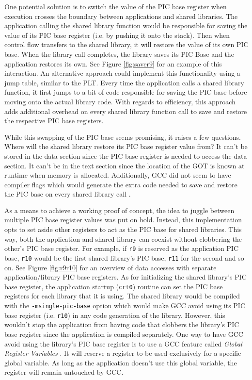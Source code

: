\documentclass[12pt]{ucsddissertation}
\begin{document}
One potential solution is to switch the value of the PIC base register when execution crosses the boundary between applications and shared libraries. The application calling the shared library function would be responsible for saving the value of its PIC base register (i.e. by pushing it onto the stack). Then when control flow transfers to the shared library, it will restore the value of its own PIC base. When the library call completes, the library saves its PIC Base and the application restores its own. See Figure \ref{fig:saver9} for an example of this interaction. An alternative approach could implement this functionality using a jump table, similar to the PLT. Every time the application calls a shared library function, it first jumps to a bit of code responsible for saving the PIC base before moving onto the actual library code. With regards to efficiency, this approach adds additional overhead on every shared library function call to save and restore the respective PIC base registers.

While this swapping of the PIC base seems promising, it raises a few questions. Where will the shared library restore its PIC base register value from? It can't be stored in the data section since the PIC base register is needed to access the data section. It can't be in the text section since the location of the GOT is known at runtime when memory is allocated. Additionally, GCC did not seem to have compiler flags which would generate the extra code needed to save and restore the PIC base on every shared library call \cite{gcc-codegen}. 

As a means to achieve a working proof of concept, the idea to juggle between multiple PIC base register values was put on hold. Instead, this implementation opts to set aside other registers to act as the PIC base for shared libraries. This way, both the application and shared library can coexist without clobbering the other's PIC base register. For example, if \texttt{r9} is reserved as the application PIC base, \texttt{r10} would be the first shared library's PIC base, \texttt{r11} for the second and so on. See Figure \ref{fig:r9r10} for an overview of data accesses with separate application/library PIC base registers. As for initializing the shared library's PIC base register, the application startup (\texttt{crt0}) routine can set the PIC base registers for each library that it is using. The shared library would be compiled with the \texttt{-msingle-pic-base} option which would make GCC avoid using its PIC base register (i.e. \texttt{r10}) in any code generation of the library. However, this wouldn't stop the application from having code that clobbers the library's PIC base register since the application is compiled separately. One way to have GCC avoid using the library's PIC base register is to use a GCC feature called \textit{Global Register Variables} \cite{gcc-hwreg}. It will reserve a register to be used exclusively for a specific global variable. As long as the application doesn't use this global variable, the register will remain untouched by GCC.
\end{document}
